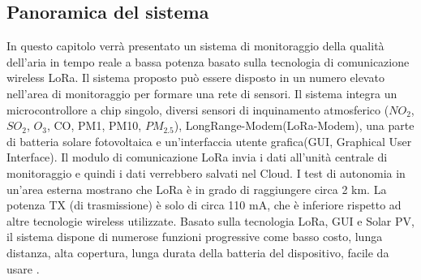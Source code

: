 \documentclass[a4paper]{report} %
\begin{document}
\subsection{Panoramica del sistema}

In questo capitolo verrà presentato un sistema di monitoraggio della qualità dell'aria in tempo reale a bassa potenza basato sulla tecnologia di comunicazione wireless LoRa. Il sistema proposto può essere disposto in un numero elevato nell'area di monitoraggio per formare una rete di sensori. Il sistema integra un microcontrollore a chip singolo, diversi sensori di inquinamento atmosferico ($ NO_{2} $, $ SO_{2} $, $ O_{3} $, CO, PM1, PM10, $ PM_{2.5} $), LongRange-Modem(LoRa-Modem), una parte di batteria solare fotovoltaica e un'interfaccia utente grafica(GUI, Graphical User Interface). Il modulo di comunicazione LoRa invia i dati all'unità centrale di monitoraggio e quindi i dati verrebbero salvati nel Cloud. I test di autonomia in un'area esterna mostrano che LoRa è in grado di raggiungere circa 2 km. La potenza TX (di trasmissione) è solo di circa 110 mA, che è inferiore rispetto ad altre tecnologie wireless utilizzate. Basato sulla tecnologia LoRa, GUI e Solar PV, il sistema dispone di numerose funzioni progressive come basso costo, lunga distanza, alta copertura, lunga durata della batteria del dispositivo, facile da usare \cite{art:rif.40}.
\end{document}
